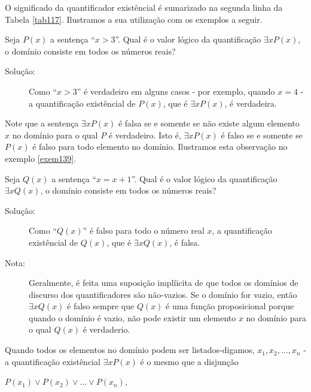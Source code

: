 O significado da quantificador existêncial é sumarizado na segunda linha da
Tabela \ref{tab117}. Ilustramos a sua utilização com os exemplos a seguir.

\begin{exmp}
\label{exem138}
Seja $P(x)$ a sentença ``$x>3$''. Qual é o valor lógico da quantificação
$\exists xP(x)$, o domínio consiste em todos os números reais?
\begin{description}
\item[Solução:] Como ``$x>3$'' é verdadeiro em alguns casos - por exemplo,
quando $x=4$ - a quantificação existêncial de $P(x)$, que é $\exists xP(x)$, é
verdadeira.
\end{description}
\end{exmp}

Note que a sentença $\exists xP(x)$ é falsa se e somente se não existe algum
elemento $x$ no domínio para o qual $P$ é verdadeiro. Isto é, $\exists xP(x)$ é
falso se e somente se $P(x)$ é falso para todo elemento no domínio. Ilustramos
esta observação no exemplo \ref{exem139}.

\begin{exmp}
\label{exem139}
Seja $Q(x)$ a sentença ``$x=x+1$''. Qual é o valor lógico da quantificação
$\exists xQ(x)$, o domínio consiste em todos os números reais?
\begin{description}
\item[Solução:] Como ``$Q(x)$'' é falso para todo o número real $x$, a
quantificação existêncial de $Q(x)$, que é $\exists xQ(x)$, é falsa.
\end{description}
\end{exmp}

\begin{description}
\item[Nota:] Geralmente, é feita uma suposição implíicita de que todos os
domínios de discurso dos quantificadores são não-vazios. Se o domínio for vazio,
então $\exists xQ(x)$ é falso sempre que $Q(x)$ é uma função proposicional
porque quando o domínio é vazio, não pode existir um elemento $x$ no domínio
para o qual $Q(x)$ é verdaderio.
\end{description}

Quando todos os elementos no domínio podem ser listados-digamos, $x_1, x_2,
\ldots, x_n$ - a quantificação existêncial $\exists xP(x)$ é o mesmo que a
disjunção

\begin{center}
$P(x_1) \lor P(x_2) \lor \ldots \lor P(x_n)$,
\end{center}


